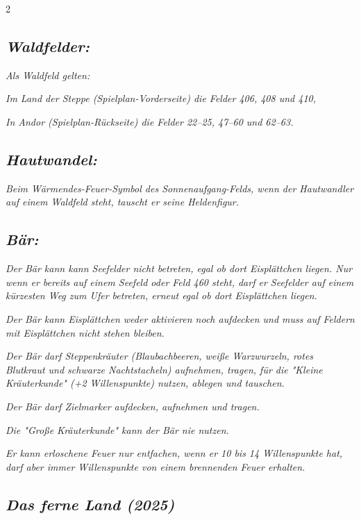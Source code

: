 \documentclass[10pt, a4paper, oneside]{book}
\newcommand{\fan}[1]{\textit{#1}}
\begin{document}
\begin{multicols*}{2}
\begin{bgcolor}
\subsection{\fan{Waldfelder:}}

\fan{Als Waldfeld gelten:}

\bullet{} \fan{Im Land der Steppe (Spielplan-Vorderseite) die Felder 406, 408 und 410,}

\bullet{} \fan{In Andor (Spielplan-Rückseite) die Felder 22–25, 47–60 und 62–63.}


\subsection{\fan{Hautwandel:}}

\fan{Beim Wärmendes-Feuer-Symbol des Sonnenaufgang-Felds, wenn der Hautwandler auf einem Waldfeld steht, tauscht er seine Heldenfigur.}


\subsection{\fan{Bär:}}


\fan{Der Bär kann kann Seefelder nicht betreten, egal ob dort Eisplättchen liegen. Nur wenn er bereits auf einem Seefeld oder Feld 460 steht, darf er Seefelder auf einem kürzesten Weg zum Ufer betreten, erneut egal ob dort Eisplättchen liegen.}

\fan{Der Bär kann Eisplättchen weder aktivieren noch aufdecken und muss auf Feldern mit Eisplättchen nicht stehen bleiben.}

\fan{Der Bär darf Steppenkräuter (Blaubachbeeren, weiße Warzwurzeln, rotes Blutkraut und schwarze Nachtstacheln) aufnehmen, tragen, für die "Kleine Kräuterkunde" (+2 Willenspunkte) nutzen, ablegen und tauschen.}

\fan{Der Bär darf Zielmarker aufdecken, aufnehmen und tragen.}

\fan{Die "Große Kräuterkunde" kann der Bär nie nutzen.}

\fan{Er kann erloschene Feuer nur entfachen, wenn er 10 bis 14 Willenspunkte hat, darf aber immer Willenspunkte von einem brennenden Feuer erhalten.}

\end{bgcolor}





\columnbreak


\begin{bgcolor}
\section{\fan{Das ferne Land (2025)}}




\end{bgcolor}
\end{multicols*}
\end{document}
